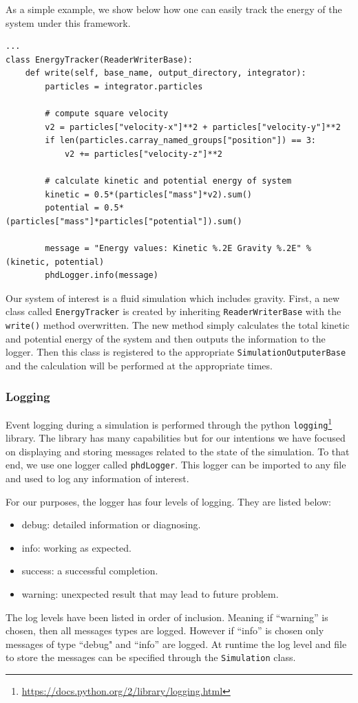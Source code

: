 As a simple example, we show below how one can easily track the energy of the system
under this framework.
\begin{lstlisting}
...
class EnergyTracker(ReaderWriterBase):
	def write(self, base_name, output_directory, integrator):
   		particles = integrator.particles
        
   		# compute square velocity
        v2 = particles["velocity-x"]**2 + particles["velocity-y"]**2
        if len(particles.carray_named_groups["position"]) == 3:
        	v2 += particles["velocity-z"]**2
            
        # calculate kinetic and potential energy of system    
        kinetic = 0.5*(particles["mass"]*v2).sum()
        potential = 0.5*(particles["mass"]*particles["potential"]).sum()
        
        message = "Energy values: Kinetic %.2E Gravity %.2E" % (kinetic, potential)
        phdLogger.info(message)
\end{lstlisting}
Our system of interest is a fluid simulation which includes gravity.
First, a new class called \lstinline{EnergyTracker} is created by inheriting \lstinline{ReaderWriterBase}
with the \lstinline{write()} method overwritten. The new method simply calculates the total kinetic
and potential energy of the system and then outputs the information to the logger. Then this
class is registered to the appropriate \lstinline{SimulationOutputerBase} and the calculation
will be performed at the appropriate times.

\subsubsection{Logging}
\label{sec.logging}
Event logging during a simulation is performed through the python 
\texttt{logging}\footnote{\url{https://docs.python.org/2/library/logging.html}} library. The library has 
many capabilities but for our intentions we have focused on displaying and storing messages related to the
state of the simulation. To that end, we use one logger called \lstinline{phdLogger}. This 
logger can be imported to any file and used to log any information of interest.

For our purposes, the logger has four levels of logging. They are listed below:
\begin{itemize}
	\item debug: detailed information or diagnosing.
    \item info: working as expected.
    \item success: a successful completion. 
    \item warning: unexpected result that may lead to future problem.
\end{itemize}
The log levels have been listed in order of inclusion. Meaning if ``warning'' is chosen, then all messages
types are logged. However if ``info'' is chosen only messages of type ``debug" and ``info'' are logged.
At runtime the log level and file to store the messages can be specified through the 
\lstinline{Simulation} class.

